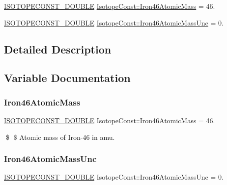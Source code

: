\begin{DoxyCompactItemize}
\item 
\mbox{\hyperlink{group___isotope_const-_macros_ga8f45a7272ce02c0b4c65c44636ed719a}{I\+S\+O\+T\+O\+P\+E\+C\+O\+N\+S\+T\+\_\+\+D\+O\+U\+B\+LE}} \mbox{\hyperlink{group___isotope_const-_iron-_fe46_ga5c4d8f8eda13c723f0ff816fbdddb462}{Isotope\+Const\+::\+Iron46\+Atomic\+Mass}} = 46.
\item 
\mbox{\hyperlink{group___isotope_const-_macros_ga8f45a7272ce02c0b4c65c44636ed719a}{I\+S\+O\+T\+O\+P\+E\+C\+O\+N\+S\+T\+\_\+\+D\+O\+U\+B\+LE}} \mbox{\hyperlink{group___isotope_const-_iron-_fe46_gac80201f2c082dcceaf82e0608cf59598}{Isotope\+Const\+::\+Iron46\+Atomic\+Mass\+Unc}} = 0.
\end{DoxyCompactItemize}


\subsection{Detailed Description}


\subsection{Variable Documentation}
\mbox{\label{group___isotope_const-_iron-_fe46_ga5c4d8f8eda13c723f0ff816fbdddb462}} 
\subsubsection{\texorpdfstring{Iron46\+Atomic\+Mass}{Iron46AtomicMass}}
{\footnotesize\ttfamily \mbox{\hyperlink{group___isotope_const-_macros_ga8f45a7272ce02c0b4c65c44636ed719a}{I\+S\+O\+T\+O\+P\+E\+C\+O\+N\+S\+T\+\_\+\+D\+O\+U\+B\+LE}} Isotope\+Const\+::\+Iron46\+Atomic\+Mass = 46.}

\$ \$ Atomic mass of Iron-\/46 in amu. \mbox{\label{group___isotope_const-_iron-_fe46_gac80201f2c082dcceaf82e0608cf59598}} 
\subsubsection{\texorpdfstring{Iron46\+Atomic\+Mass\+Unc}{Iron46AtomicMassUnc}}
{\footnotesize\ttfamily \mbox{\hyperlink{group___isotope_const-_macros_ga8f45a7272ce02c0b4c65c44636ed719a}{I\+S\+O\+T\+O\+P\+E\+C\+O\+N\+S\+T\+\_\+\+D\+O\+U\+B\+LE}} Isotope\+Const\+::\+Iron46\+Atomic\+Mass\+Unc = 0.}

